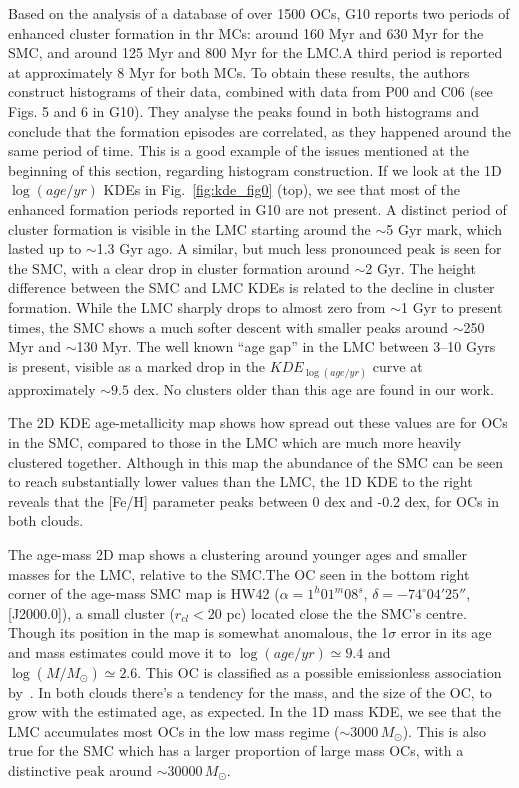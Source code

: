 \documentclass[a4paper,fleqn,usenatbib]{mnras}
\begin{document}
Based on the analysis of a database of over 1500 OCs, G10 reports two periods of
enhanced cluster formation in thr MCs: around 160 Myr and 630 Myr for the SMC,
and around 125 Myr and 800 Myr for the LMC.\@ A third period is reported at
approximately 8 Myr for both MCs.
%
To obtain these results, the authors construct histograms of their data,
combined with data from P00 and C06 (see Figs. 5 and 6 in G10). They analyse the
peaks found in both histograms and conclude that the formation episodes are
correlated, as they happened around the same period of time.
%
This is a good example of the issues mentioned at the beginning of this section,
regarding histogram construction. If we look at the 1D $\log(age/yr)$ KDEs in
Fig.~\ref{fig:kde_fig0} (top), we see that most of the enhanced formation
periods reported in G10 are not present.
A distinct period of cluster formation is visible in the LMC starting around the
${\sim}$5 Gyr mark, which lasted up to ${\sim}$1.3 Gyr ago.
A similar, but much less pronounced peak is seen for the SMC, with a clear drop
in cluster formation around ${\sim}$2 Gyr.
The height difference  between the SMC and LMC KDEs is related to the decline in
cluster formation. While the LMC sharply drops to almost zero from ${\sim}$1 Gyr
to present times, the SMC shows a much softer descent with smaller peaks
around ${\sim}$250 Myr and ${\sim}$130 Myr.
The well known ``age gap'' in the LMC between 3--10 Gyrs~\citep{Balbinot_2010}
is present, visible as a marked drop in the $KDE_{\log(age/yr)}$ curve at
approximately $\sim9.5$ dex. No clusters older than this age are found in our
work.

The 2D KDE age-metallicity map shows how spread out these values are for OCs in
the SMC, compared to those in the LMC which are much more heavily
clustered together.
Although in this map the abundance of the SMC can be seen to reach
substantially lower values than the LMC, the 1D KDE to the right reveals that
the [Fe/H] parameter peaks between 0 dex and -0.2 dex, for OCs in both clouds.

The age-mass 2D map shows a clustering around younger ages and smaller masses
for the LMC, relative to the SMC.\@ The OC seen in the bottom right corner of
the age-mass SMC map is HW42 ($\alpha{=}1^h01^m08^s$, $\delta
{=}-74^\circ04'25''$, [J2000.0]), a small cluster ($r_{cl}{<}20$ pc) located
close the the SMC's centre. Though its position in the map is somewhat
anomalous, the 1$\sigma$ error in its age and mass estimates could move it to
$\log(age/yr){\simeq}9.4$ and $\log(M/M_{\odot}){\simeq}2.6$. This OC is
classified as a possible emissionless association by~\cite{Bica_1995}.
%
In both clouds there's a tendency for the mass, and the size of the OC, to grow
with the estimated age, as expected.
In the 1D mass KDE, we see that the LMC accumulates most OCs in the low mass
regime (${\sim}3000\,M_{\odot}$).
This is also true for the SMC which has a larger proportion of large mass OCs,
with a distinctive peak around ${\sim}30000\,M_{\odot}$.
\end{document}
